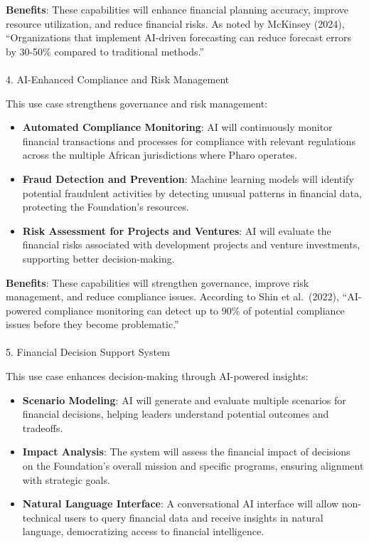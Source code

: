 \documentclass[
]{article}
\makeatletter
\let\oldparagraph\paragraph
\renewcommand{\paragraph}{
    \@ifstar
      \xxxParagraphStar
      \xxxParagraphNoStar
  }
\newcommand{\xxxParagraphStar}[1]{\oldparagraph*{#1}\mbox{}}
\newcommand{\xxxParagraphNoStar}[1]{\oldparagraph{#1}\mbox{}}
\makeatother
\begin{document}
\textbf{Benefits}: These capabilities will enhance financial planning
accuracy, improve resource utilization, and reduce financial risks. As
noted by McKinsey (2024), ``Organizations that implement AI-driven
forecasting can reduce forecast errors by 30-50\% compared to
traditional methods.''

\paragraph{4. AI-Enhanced Compliance and Risk
Management}\label{ai-enhanced-compliance-and-risk-management}

This use case strengthens governance and risk management:

\begin{itemize}
\item
  \textbf{Automated Compliance Monitoring}: AI will continuously monitor
  financial transactions and processes for compliance with relevant
  regulations across the multiple African jurisdictions where Pharo
  operates.
\item
  \textbf{Fraud Detection and Prevention}: Machine learning models will
  identify potential fraudulent activities by detecting unusual patterns
  in financial data, protecting the Foundation's resources.
\item
  \textbf{Risk Assessment for Projects and Ventures}: AI will evaluate
  the financial risks associated with development projects and venture
  investments, supporting better decision-making.
\end{itemize}

\textbf{Benefits}: These capabilities will strengthen governance,
improve risk management, and reduce compliance issues. According to Shin
et al.~(2022), ``AI-powered compliance monitoring can detect up to 90\%
of potential compliance issues before they become problematic.''

\paragraph{5. Financial Decision Support
System}\label{financial-decision-support-system}

This use case enhances decision-making through AI-powered insights:

\begin{itemize}
\item
  \textbf{Scenario Modeling}: AI will generate and evaluate multiple
  scenarios for financial decisions, helping leaders understand
  potential outcomes and tradeoffs.
\item
  \textbf{Impact Analysis}: The system will assess the financial impact
  of decisions on the Foundation's overall mission and specific
  programs, ensuring alignment with strategic goals.
\item
  \textbf{Natural Language Interface}: A conversational AI interface
  will allow non-technical users to query financial data and receive
  insights in natural language, democratizing access to financial
  intelligence.
\end{itemize}
\end{document}
